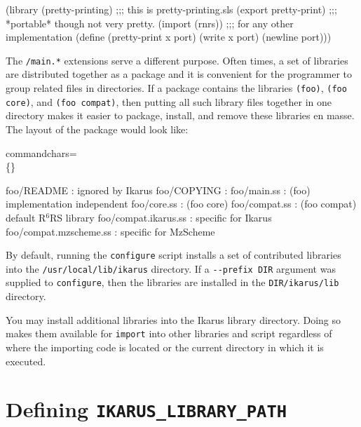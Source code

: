 \documentclass[onecolumn, 12pt, twoside, openright, dvipdfm]{book}
\newcommand{\rnrs}[1]{R$^{\mathrm{#1}}$RS}
\begin{document}
\begin{CodeInline}
(library (pretty-printing) ;;; this is pretty-printing.sls
  (export pretty-print)    ;;; *portable* though not very pretty.
  (import (rnrs))          ;;; for any other implementation
  (define (pretty-print x port)
    (write x port)
    (newline port)))
\end{CodeInline}

The \verb|/main.*| extensions serve a different purpose.  Often
times, a set of libraries are distributed together as a package and
it is convenient for the programmer to group related files in
directories.  If a package contains the libraries \verb|(foo)|,
\verb|(foo core)|, and \verb|(foo compat)|, then putting all such
library files together in one directory makes it easier to
package, install, and remove these libraries en masse.  The layout
of the package would look like:

 {%
  commandchars=\\\{\}}

\begin{Code}
  foo/README              :              {\textrm{ignored by Ikarus}}
  foo/COPYING             :
  foo/main.ss             : (foo)        {\textrm{implementation independent}}
  foo/core.ss             : (foo core) 
  foo/compat.ss           : (foo compat) {\textrm{default \rnrs{6} library}}
  foo/compat.ikarus.ss    :              {\textrm{specific for Ikarus}}
  foo/compat.mzscheme.ss  :              {\textrm{specific for MzScheme}}
\end{Code}


By default, running the \texttt{configure} script
installs a set of contributed libraries into the
\verb|/usr/local/lib/ikarus| directory.  If a \verb|--prefix DIR|
argument was supplied to \texttt{configure}, then the libraries are
installed in the \verb|DIR/ikarus/lib| directory.  

You may install additional libraries into the Ikarus library
directory.  Doing so makes them available for \texttt{import} into
other libraries and script regardless of where the importing code is
located or the current directory in which it is executed.  

\section{Defining \texttt{IKARUS\_LIBRARY\_PATH}}
\end{document}
